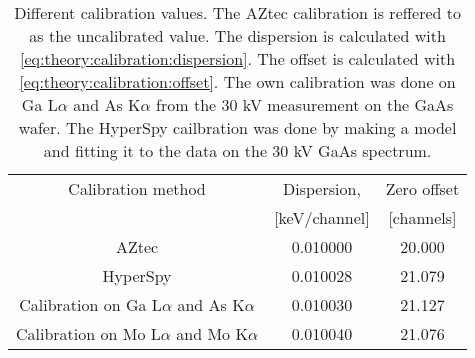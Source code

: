 \begin{table}[ht]
    \centering
    \caption{
        Different calibration values.
        The AZtec calibration is reffered to as the uncalibrated value.
        The dispersion is calculated with \cref{eq:theory:calibration:dispersion}.
        The offset is calculated with \cref{eq:theory:calibration:offset}.
        The own calibration was done on Ga L$\alpha$ and As K$\alpha$ from the 30 kV measurement on the GaAs wafer.
        The HyperSpy cailbration was done by making a model and fitting it to the data on the 30 kV GaAs spectrum.
    }
    \label{tab:results:calibrations}
    \begin{tabular}{ccc}
        Calibration method                           & Dispersion,   & Zero offset \\
                                                     & [keV/channel] & [channels]  \\
        \hline
        AZtec                                        & 0.010000      & 20.000      \\
        HyperSpy                                     & 0.010028      & 21.079      \\
        Calibration on Ga L$\alpha$ and As K$\alpha$ & 0.010030      & 21.127      \\
        Calibration on Mo L$\alpha$ and Mo K$\alpha$ & 0.010040      & 21.076
    \end{tabular}
\end{table}
